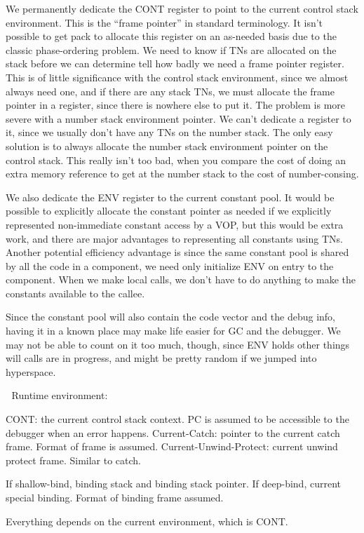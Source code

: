 {\begin{itemize, spread 0, spacing 1}
We permanently dedicate the CONT register to point to the current control stack
environment.  This is the ``frame pointer'' in standard terminology.  It isn't
possible to get pack to allocate this register on an as-needed basis due to the
classic phase-ordering problem.  We need to know if TNs are allocated on the
stack before we can determine tell how badly we need a frame pointer register.
This is of little significance with the control stack environment, since we
almost always need one, and if there are any stack TNs, we must allocate the
frame pointer in a register, since there is nowhere else to put it.  The
problem is more severe with a number stack environment pointer.  We can't
dedicate a register to it, since we usually don't have any TNs on the number
stack.  The only easy solution is to always allocate the number stack
environment pointer on the control stack.  This really isn't too bad, when you
compare the cost of doing an extra memory reference to get at the number stack
to the cost of number-consing.

We also dedicate the ENV register to the current constant pool.  It would be
possible to explicitly allocate the constant pointer as needed if we explicitly
represented non-immediate constant access by a VOP, but this would be extra
work, and there are major advantages to representing all constants using TNs.
Another potential efficiency advantage is since the same constant pool is
shared by all the code in a component, we need only initialize ENV on entry to
the component.  When we make local calls, we don't have to do anything to make
the constants available to the callee.

Since the constant pool will also contain the code vector and the debug info,
having it in a known place may make life easier for GC and the debugger.  We
may not be able to count on it too much, though, since ENV holds other things
will calls are in progress, and might be pretty random if we jumped into
hyperspace.


Runtime environment:

CONT: the current control stack context.
PC is assumed to be accessible to the debugger when an error happens.
Current-Catch: pointer to the current catch frame.  Format of frame is assumed.
Current-Unwind-Protect: current unwind protect frame.  Similar to catch.

If shallow-bind, binding stack and binding stack pointer.
If deep-bind, current special binding.  Format of binding frame assumed.

Everything depends on the current environment, which is CONT.


\end{itemize, spread 0, spacing 1}}
